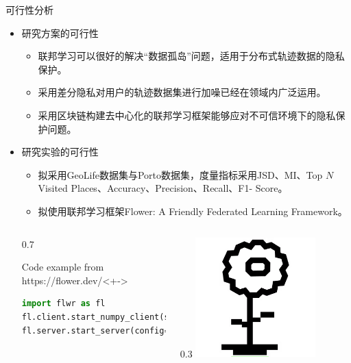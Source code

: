 \documentclass{sintefbeamer}
\begin{document}
\begin{frame}[fragile]{可行性分析}
\begin{itemize}
\item 研究方案的可行性
  \begin{itemize}
  \item 联邦学习可以很好的解决“数据孤岛”问题，适用于分布式轨迹数据的隐私保护。
  \item 采用差分隐私对用户的轨迹数据集进行加噪已经在领域内广泛运用。
  \item 采用区块链构建去中心化的联邦学习框架能够应对不可信环境下的隐私保护问题。
  \end{itemize}
\item 研究实验的可行性
  \begin{itemize}
  \item 拟采用GeoLife数据集与Porto数据集，度量指标采用JSD、MI、Top $N$ Visited Places、Accuracy、Precision、Recall、F1- Score。
  \item 拟使用联邦学习框架Flower: A Friendly Federated Learning Framework。
\end{itemize}
\begin{columns}
\begin{column}{0.7\textwidth}
\begin{block}{Code example from https://flower.dev/}<+->
\begin{lstlisting}[language=Python]
import flwr as fl
fl.client.start_numpy_client(server_address="[::]:8080", client=CifarClient())
fl.server.start_server(config=fl.server.ServerConfig(num_rounds=3))
\end{lstlisting}
\end{block}
\end{column}
\end{columns}
 
\end{itemize}

\end{frame}
\end{document}
